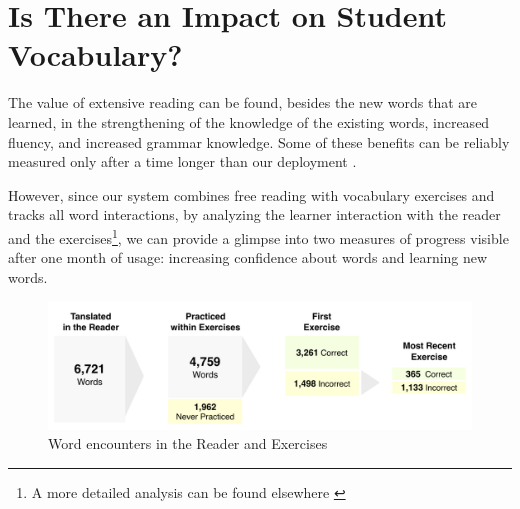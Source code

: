 
\newpage
\section{Is There an Impact on Student Vocabulary?}

  The value of extensive reading can be found, besides the new words that are learned, in the strengthening of the knowledge of the existing words, increased fluency, and increased grammar knowledge. Some of these benefits can be reliably measured only after a time longer than our deployment \cite{renadya07-power}. 

  However, since our system combines free reading with vocabulary exercises and tracks all word interactions, by analyzing the learner interaction with the reader and the exercises\footnote{A more detailed analysis can be found elsewhere \cite{Avagyan17a-blocks}}, we can provide a glimpse into two measures of progress visible after one month of usage: increasing confidence about words and learning new words. 

   \begin{figure}[h!]
  \centering
    \includegraphics[width=0.9\columnwidth,trim={0 10 0 15},clip]{figures/word-learning-flow.pdf}
    \caption{Word encounters in the Reader and Exercises}
    \label{fig:word_learning_flow}
  \end{figure}

